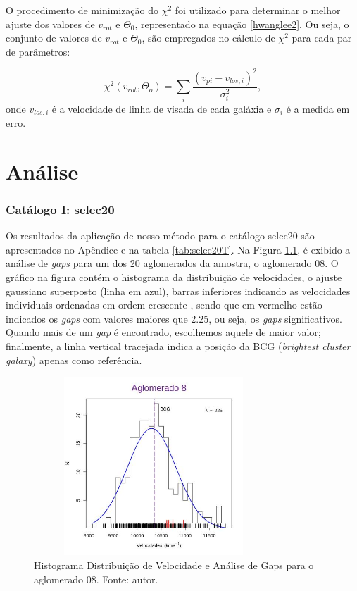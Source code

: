 O procedimento de minimização do $\chi^2$ foi utilizado para determinar o melhor ajuste dos valores de $v_{rot}$ e $\Theta_0$, representado na equação \ref{hwanglee2}. Ou seja, o conjunto de valores de $v_{rot}$ e $\Theta_0$, são empregados no cálculo de $\chi^2$ para cada par de parâmetros:

\begin{equation}
 \chi^2 (v_{rot}, \Theta_o) = \sum_i{\frac{(v_{pi} - v_{los, i})^2}{\sigma^{2}_{i}}} ,
 \label{hwanglee2}
\end{equation}
onde $v_{los, i}$ é a velocidade de linha de visada de cada galáxia e $\sigma_i$ é a medida em erro.

\chapter{Análise}

\subsection{Catálogo I: selec20}
Os resultados da aplicação de nosso método para o catálogo selec20 são apresentados no Apêndice e na tabela \ref{tab:selec20T}. Na Figura \ref{selec20gap}, é exibido a análise de \textit{gaps} para um dos 20 aglomerados da amostra, o aglomerado 08. O gráfico na figura contém o histograma da distribuição de velocidades, o ajuste gaussiano superposto (linha em azul), barras inferiores indicando as velocidades individuais ordenadas em ordem crescente , sendo que em vermelho estão indicados os \textit{gaps} com valores maiores que 2.25, ou seja, os \textit{gaps} significativos. Quando mais de um \textit{gap} é encontrado, escolhemos aquele de maior valor; finalmente, a linha vertical tracejada indica a posição da BCG (\textit{brightest cluster galaxy}) apenas como referência. 

\begin{figure}[!htbp] %
\vspace{-2pt}
\begin{center}
\includegraphics[height=6.7cm,width=9cm]{04-figuras/selec20gap}%
\caption{Histograma Distribuição de Velocidade e Análise de Gaps para o aglomerado 08. Fonte: autor.}
\label{selec20gap}%
\end{center}
\end{figure}


